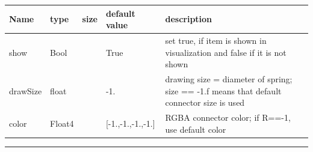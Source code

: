 \begin{center}
  \footnotesize
  \begin{longtable}{| p{4.5cm} | p{2.5cm} | p{0.5cm} | p{2.5cm} | p{6cm} |}
    \hline
    \bf Name & \bf type & \bf size & \bf default value & \bf description \\ \hline
    show &     Bool &      &     True &     set true, if item is shown in visualization and false if it is not shown\\ \hline
    drawSize &     float &      &     -1. &     drawing size = diameter of spring; size == -1.f means that default connector size is used\\ \hline
    color &     Float4 &      &     [-1.,-1.,-1.,-1.] &     RGBA connector color; if R==-1, use default color\\ \hline
	  \end{longtable}
	\end{center}
\par\noindent\rule{\textwidth}{0.4pt}
\label{description_ObjectConnectorCoordinateSpringDamper}

